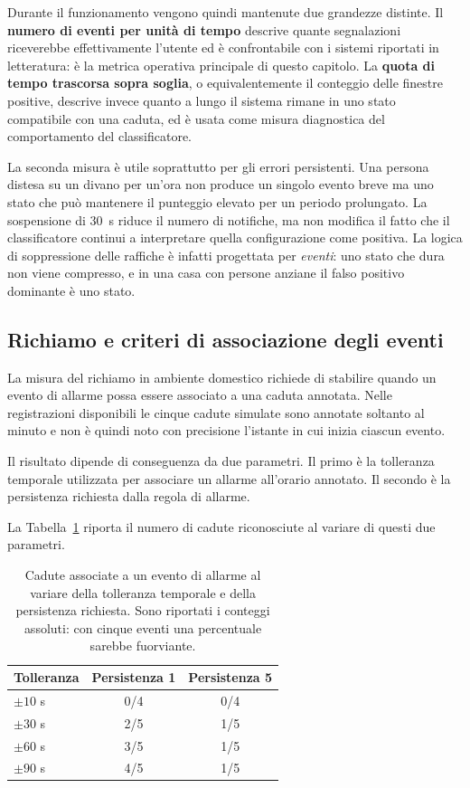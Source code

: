 Durante il funzionamento vengono quindi mantenute due grandezze distinte. Il \textbf{numero di eventi per unità di tempo} descrive quante segnalazioni riceverebbe effettivamente l'utente ed è confrontabile con i sistemi riportati in letteratura: è la metrica operativa principale di questo capitolo. La \textbf{quota di tempo trascorsa sopra soglia}, o equivalentemente il conteggio delle finestre positive, descrive invece quanto a lungo il sistema rimane in uno stato compatibile con una caduta, ed è usata come misura diagnostica del comportamento del classificatore.

La seconda misura è utile soprattutto per gli errori persistenti. Una persona distesa su un divano per un'ora non produce un singolo evento breve ma uno stato che può mantenere il punteggio elevato per un periodo prolungato. La sospensione di 30~s riduce il numero di notifiche, ma non modifica il fatto che il classificatore continui a interpretare quella configurazione come positiva. La logica di soppressione delle raffiche è infatti progettata per \emph{eventi}: uno stato che dura non viene compresso, e in una casa con persone anziane il falso positivo dominante è uno stato.

\subsection{Richiamo e criteri di associazione degli eventi}
\label{sec:recall-campo}

La misura del richiamo in ambiente domestico richiede di stabilire quando un evento di allarme possa essere associato a una caduta annotata. Nelle registrazioni disponibili le cinque cadute simulate sono annotate soltanto al minuto e non è quindi noto con precisione l'istante in cui inizia ciascun evento.

Il risultato dipende di conseguenza da due parametri. Il primo è la tolleranza temporale utilizzata per associare un allarme all'orario annotato. Il secondo è la persistenza richiesta dalla regola di allarme.

La Tabella~\ref{tab:tolleranza} riporta il numero di cadute riconosciute al variare di questi due parametri.

\begin{table}[ht]
\centering
\caption{Cadute associate a un evento di allarme al variare della tolleranza
temporale e della persistenza richiesta. Sono riportati i conteggi assoluti:
con cinque eventi una percentuale sarebbe fuorviante.}
\label{tab:tolleranza}
\begin{tabular}{lcc}
\toprule
\textbf{Tolleranza} &
\textbf{Persistenza 1} &
\textbf{Persistenza 5} \\
\midrule
$\pm10$ s & 0/4 & 0/4 \\
$\pm30$ s & 2/5 & 1/5 \\
$\pm60$ s & 3/5 & 1/5 \\
$\pm90$ s & 4/5 & 1/5 \\
\bottomrule
\end{tabular}
\end{table}

